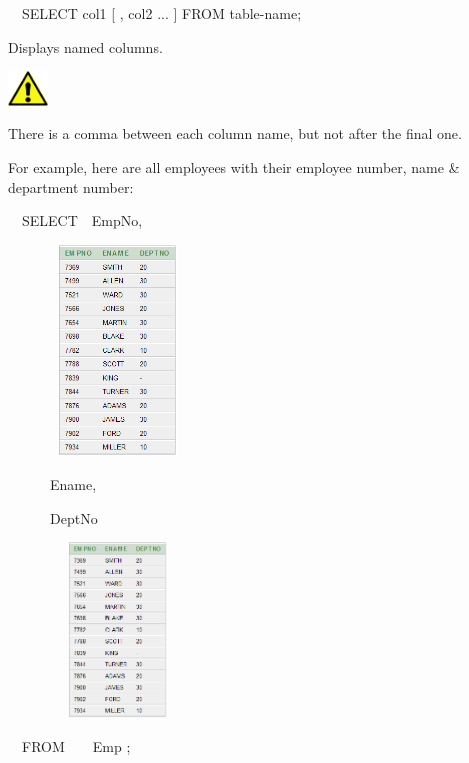 \ \ SELECT  col1 [ , col2 ... ] FROM table-name;

Displays named columns.



\begin{center}
  
\includegraphics[width=1.076cm,height=0.917cm]{images/img (2).png}

\end{center}
There is a comma between each column name, but not after the final one.

For example, here are all employees with their employee number, name \& department number:

\ \ SELECT\ \ EmpNo,

\begin{center}
  
\includegraphics[width=5.826cm,height=5.6cm]{images/img (17).png}

\end{center}
\ \ \ \ \ \ Ename,

\ \ \ \ \ \ DeptNo

\begin{center}
  
\includegraphics[width=5.826cm,height=4.662cm]{images/img (17).png}

\end{center}
\ \ FROM\ \ \ \ Emp ;

